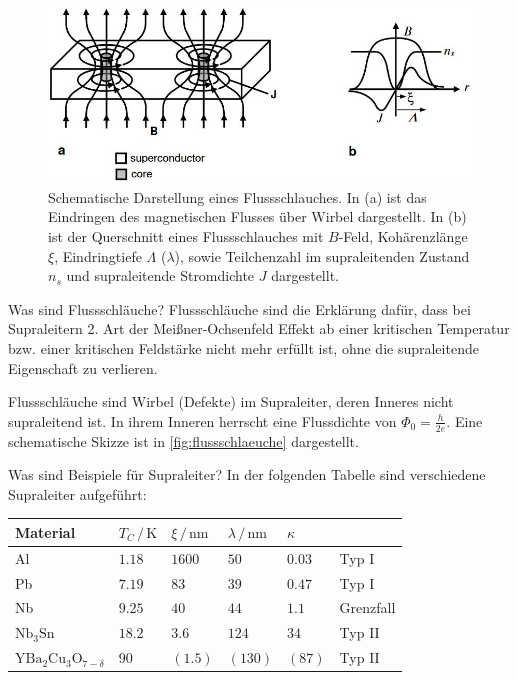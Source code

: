 \begin{figure}[!ht]
    \centering
    \includegraphics[width=.8\linewidth]{img/SuperconductorVortexStructure.jpg}
    \caption{Schematische Darstellung eines Flussschlauches. 
    In (a) ist das Eindringen des magnetischen Flusses über Wirbel dargestellt. 
    In (b) ist der Querschnitt eines Flussschlauches mit $B$-Feld, Kohärenzlänge $\xi$, Eindringtiefe $\Lambda$ ($\lambda$), sowie Teilchenzahl im supraleitenden Zustand $n_s$ und supraleitende Stromdichte $J$ dargestellt.
    }
    \label{fig:flussschlaeuche}
\end{figure}

\begin{fquestion}{Was sind Flussschläuche?}
    Flussschläuche sind die Erklärung dafür, dass bei Supraleitern 2. Art der Meißner-Ochsenfeld Effekt ab einer kritischen Temperatur bzw. einer kritischen Feldstärke nicht mehr erfüllt ist, ohne die supraleitende Eigenschaft zu verlieren.
    
    Flussschläuche sind Wirbel (Defekte) im Supraleiter, deren Inneres nicht supraleitend ist. 
    In ihrem Inneren herrscht eine Flussdichte von $\Phi_0 = \frac{h}{2e}$. 
    Eine schematische Skizze ist in \autoref{fig:flussschlaeuche} dargestellt.
\end{fquestion}

\begin{fquestion}{Was sind Beispiele für Supraleiter?}
    In der folgenden Tabelle sind verschiedene Supraleiter aufgeführt:
    \begin{center}
        \begin{tabular}{|l|lllll|}
            \hline
            Material & $T_C\, /\, \si{\kelvin}$ & $\xi\, /\, \si{\nano\metre}$ & $\lambda\, /\, \si{\nano\metre}$ & $\kappa$ &  \\
            \hline
            Al & $1.18$ & $1600$ & $50$ & $0.03$ & Typ I \\
            Pb & $7.19$ & $83$ & $39$ & $0.47$ & Typ I \\
            \hline
            Nb & $9.25$ & $40$ & $44$ & $1.1$ & Grenzfall\\
            \hline
            $\text{Nb}_3\text{Sn}$ & $18.2$ & $3.6$ & $124$ & $34$ & Typ II \\
            $\text{YBa}_2\text{Cu}_3\text{O}_{7 - \delta}$ & $90$ & $(1.5)$ & $(130)$ & $(87)$ & Typ II \\
            \hline
        \end{tabular}
    \end{center}
\end{fquestion}

